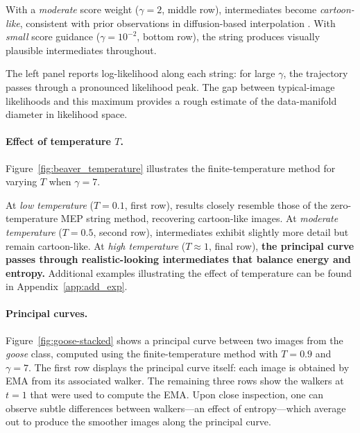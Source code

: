 \documentclass{article}
\theoremstyle{plain}
\theoremstyle{definition}
\theoremstyle{remark}
\begin{document}
With a \emph{moderate} score weight ($\gamma = 2$, \textcolor{myblue}{middle row}), intermediates become \emph{cartoon-like}, consistent with prior observations in diffusion-based interpolation \citep{guth2025learning, karczewski2025diffusion}. With \emph{small} score guidance ($\gamma = 10^{-2}$, \textcolor{mypurple}{bottom row}), the string produces visually plausible intermediates throughout.




The left panel reports log-likelihood along each string: for large $\gamma$, the trajectory passes through a pronounced likelihood peak. The gap between typical-image likelihoods and this maximum provides a rough estimate of the data-manifold diameter in likelihood space.



\paragraph{Effect of temperature $T$.} Figure~\ref{fig:beaver_temperature} illustrates the finite-temperature method for varying $T$ when $\gamma=7$.



At \emph{low temperature} ($T = 0.1$, \textcolor{mygreen}{first row}), results closely resemble those of the zero-temperature MEP string method, recovering cartoon-like images. At \emph{moderate temperature} ($T = 0.5$, \textcolor{myblue}{second row}), intermediates exhibit slightly more detail but remain cartoon-like. At \emph{high temperature} ($T \approx 1$, \textcolor{mypurple}{final row}), \textbf{the principal curve passes through realistic-looking intermediates that balance energy and entropy.} Additional examples illustrating the effect of temperature can be found in Appendix~\ref{app:add_exp}.

\paragraph{Principal curves.} Figure~\ref{fig:goose-stacked} shows a principal curve between two images from the \emph{goose} class, computed using the finite-temperature method with $T = 0.9$ and $\gamma = 7$. The first row displays the principal curve itself: each image is obtained by EMA from its associated walker. The remaining three rows show the walkers at $t = 1$ that were used to compute the EMA. Upon close inspection, one can observe subtle differences between walkers---an effect of entropy---which average out to produce the smoother images along the principal curve.
\end{document}
